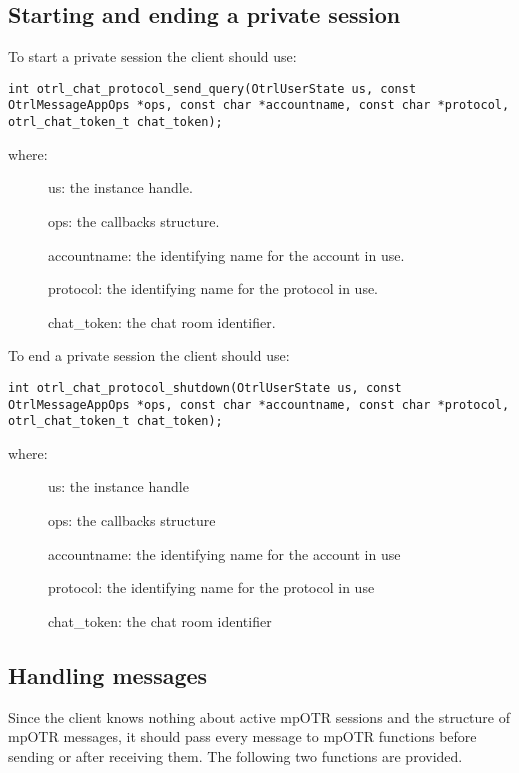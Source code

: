 \subsection{Starting and ending a private session}
To start a private session the client should use:
\begin{lstlisting}
int otrl_chat_protocol_send_query(OtrlUserState us, const OtrlMessageAppOps *ops, const char *accountname, const char *protocol, otrl_chat_token_t chat_token);
\end{lstlisting}
where:
\begin{description}
  \item[] us: the instance handle.
  \item[] ops: the callbacks structure.
  \item[] accountname: the identifying name for the account in use.
  \item[] protocol: the identifying name for the protocol in use.
  \item[] chat\_token: the chat room identifier.
\end{description}

To end a private session the client should use:
\begin{lstlisting}
int otrl_chat_protocol_shutdown(OtrlUserState us, const OtrlMessageAppOps *ops, const char *accountname, const char *protocol, otrl_chat_token_t chat_token);
\end{lstlisting}

where:
\begin{description}
  \item[] us: the instance handle
  \item[] ops: the callbacks structure
  \item[] accountname: the identifying name for the account in use
  \item[] protocol: the identifying name for the protocol in use
  \item[] chat\_token: the chat room identifier
\end{description}

\subsection{Handling messages}
Since the client knows nothing about active mpOTR sessions and the structure of mpOTR messages, it should pass every message to mpOTR functions before sending or after receiving them. The following two functions are provided. 

